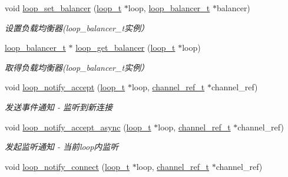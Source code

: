 \begin{DoxyCompactItemize}
void \hyperlink{a00070_abedbb538c1cc8ef805dbfc0f58d80f9e_abedbb538c1cc8ef805dbfc0f58d80f9e}{loop\+\_\+set\+\_\+balancer} (\hyperlink{a00051_a9c3ad1cd2de83e09f3a7b59fa82c94ee_a9c3ad1cd2de83e09f3a7b59fa82c94ee}{loop\+\_\+t} $\ast$loop, \hyperlink{a00051_a649c7e850ab247b5f70ad27e335a129d_a649c7e850ab247b5f70ad27e335a129d}{loop\+\_\+balancer\+\_\+t} $\ast$balancer)
\begin{DoxyCompactList}\small\item\em 设置负载均衡器(loop\+\_\+balancer\+\_\+t实例） \end{DoxyCompactList}\item 
\hyperlink{a00051_a649c7e850ab247b5f70ad27e335a129d_a649c7e850ab247b5f70ad27e335a129d}{loop\+\_\+balancer\+\_\+t} $\ast$ \hyperlink{a00070_a1f9df6866c80e91a620320298d199315_a1f9df6866c80e91a620320298d199315}{loop\+\_\+get\+\_\+balancer} (\hyperlink{a00051_a9c3ad1cd2de83e09f3a7b59fa82c94ee_a9c3ad1cd2de83e09f3a7b59fa82c94ee}{loop\+\_\+t} $\ast$loop)
\begin{DoxyCompactList}\small\item\em 取得负载均衡器(loop\+\_\+balancer\+\_\+t实例） \end{DoxyCompactList}\item 
void \hyperlink{a00070_a61e9eb6eeaaad4d1d655beba05bb8440_a61e9eb6eeaaad4d1d655beba05bb8440}{loop\+\_\+notify\+\_\+accept} (\hyperlink{a00051_a9c3ad1cd2de83e09f3a7b59fa82c94ee_a9c3ad1cd2de83e09f3a7b59fa82c94ee}{loop\+\_\+t} $\ast$loop, \hyperlink{a00051_a151271c9d188ef28d4d24bb81dcc1263_a151271c9d188ef28d4d24bb81dcc1263}{channel\+\_\+ref\+\_\+t} $\ast$channel\+\_\+ref)
\begin{DoxyCompactList}\small\item\em 发送事件通知 -\/ 监听到新连接 \end{DoxyCompactList}\item 
void \hyperlink{a00070_a846d409d477916f7d5cb0da240ef000d_a846d409d477916f7d5cb0da240ef000d}{loop\+\_\+notify\+\_\+accept\+\_\+async} (\hyperlink{a00051_a9c3ad1cd2de83e09f3a7b59fa82c94ee_a9c3ad1cd2de83e09f3a7b59fa82c94ee}{loop\+\_\+t} $\ast$loop, \hyperlink{a00051_a151271c9d188ef28d4d24bb81dcc1263_a151271c9d188ef28d4d24bb81dcc1263}{channel\+\_\+ref\+\_\+t} $\ast$channel\+\_\+ref)
\begin{DoxyCompactList}\small\item\em 发起监听通知 -\/ 当前loop内监听 \end{DoxyCompactList}\item 
void \hyperlink{a00070_a32f076ad9889fd658c51d7dd0a300ed0_a32f076ad9889fd658c51d7dd0a300ed0}{loop\+\_\+notify\+\_\+connect} (\hyperlink{a00051_a9c3ad1cd2de83e09f3a7b59fa82c94ee_a9c3ad1cd2de83e09f3a7b59fa82c94ee}{loop\+\_\+t} $\ast$loop, \hyperlink{a00051_a151271c9d188ef28d4d24bb81dcc1263_a151271c9d188ef28d4d24bb81dcc1263}{channel\+\_\+ref\+\_\+t} $\ast$channel\+\_\+ref)

\end{DoxyCompactItemize}
